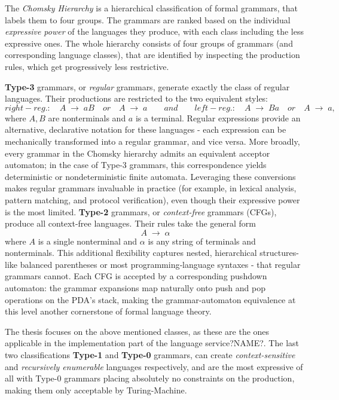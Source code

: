 The \textit{Chomsky Hierarchy} is a hierarchical classification of formal grammars, that labels them to four groups. The grammars are ranked based on the
individual \textit{expressive power} of the languages they produce, with each class including the less expressive ones. The whole hierarchy consists of four
groups of grammars (and corresponding language classes), that are identified by inspecting the production rules, which get progressively less restrictive.

\textbf{Type-3} grammars, or \emph{regular} grammars, generate exactly the class of regular languages. Their productions are restricted to the two equivalent styles:
\[
  right-reg.: \quad A \;\to\; aB \quad or \quad A \;\to\; a
  \qquad and \qquad
  left-reg.: \quad A \;\to\; Ba \quad or \quad A \;\to\; a,
\]
where \(A,B\) are nonterminals and \(a\) is a terminal. Regular expressions provide an alternative, declarative notation for these languages - each expression
can be mechanically transformed into a regular grammar, and vice versa. More broadly, every grammar in the Chomsky hierarchy admits an equivalent acceptor automaton;
in the case of Type-3 grammars, this correspondence yields deterministic or nondeterministic finite automata. Leveraging these conversions makes regular grammars
invaluable in practice (for example, in lexical analysis, pattern matching, and protocol verification), even though their expressive power is the most limited.
\textbf{Type-2} grammars, or \emph{context-free} grammars (CFGs), produce all context-free languages.
Their rules take the general form  \[A \;\to\; \alpha\] where \(A\) is a single nonterminal and \(\alpha\) is any string of terminals and nonterminals.
This additional flexibility captures nested, hierarchical structures-like balanced parentheses or most programming‐language syntaxes - that regular grammars cannot.
Each CFG is accepted by a corresponding pushdown automaton: the grammar expansions map naturally onto push and pop operations on the PDA’s stack, making the grammar-automaton
equivalence at this level another cornerstone of formal language theory.

The thesis focuses on the above mentioned classes, as these are the ones applicable in the implementation part of the language service?NAME?. The last two classifications
\textbf{Type-1} and \textbf{Type-0} grammars, can create \textit{context-sensitive} and \textit{recursively enumerable} languages respectively, and are the most expressive
of all with Type-0 grammars placing absolutely no constraints on the production, making them only acceptable by Turing-Machine.

